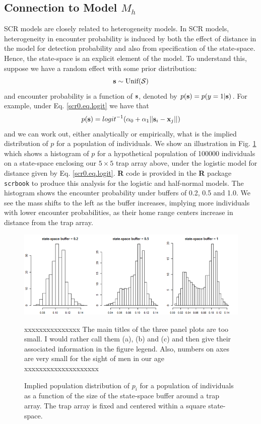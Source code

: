 \subsection{Connection to Model  $M_h$}  \label{scr0.sec.scrmh}

SCR models are closely related to heterogeneity models. In SCR models,
heterogeneity in encounter probability is induced by both the effect
of distance in the model for detection probability and also from
specification of the state-space. Hence, the state-space  is an
explicit element of the model. 
To understand this, suppose we have a random
effect with some prior distribution:
\[
{\bf s} \sim \mbox{Unif}({\cal S})
\]
and encounter probability is a function of ${\bf s}$, denoted by 
 $p({\bf s}) = p(y=1|{\bf s})$. 
For example, under Eq. \ref{scr0.eq.logit}
we have that 
\[
p({\bf s}) = logit^{-1} ( \alpha_{0} + \alpha_1 ||{\bf
  s}_{i}-{\bf x}_{j} || )
\]
and we can work out, either analytically or empirically, what is the
implied distribution of $p$ for a population of individuals.  We show
an illustration in Fig. \ref{scr0.fig.buffereffect} which shows a
histogram of $p$ for a hypothetical population of 100000 individuals
on a state-space enclosing our $5 \times 5$ trap array above, under
the logistic model for distance given by Eq. \ref{scr0.eq.logit}. {\bf
  R} code is provided in the {\bf R} package \mbox{\tt scrbook} to
produce this analysis for the logistic and half-normal models. The
histogram shows the encounter probability under buffers of 0.2, 0.5
and 1.0. We see the mass shifts to the left as the buffer increases,
implying more individuals with lower encounter probabilities, as their
home range centers increase in distance from the trap array.


\begin{figure}
\begin{center}
\includegraphics[width=5in]{Ch4/figs/buffereffect}
\end{center}
\caption{Implied population distribution of $p_{i}$ for a population
  of individuals as a function of the size of the state-space buffer
  around a trap array. The trap array is fixed and centered within a
  square state-space.}
xxxxxxxxxxxxxxx
The main titles of the three panel plots are too small. I would rather
call them (a), (b) and (c) and then give their associated information
in the figure legend. Also, numbers on axes are very small for the
sight of men in our age  xxxxxxxxxxxxxxxxxxxx
\label{scr0.fig.buffereffect}
\end{figure}

